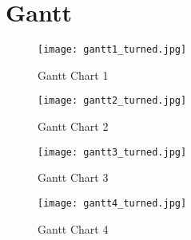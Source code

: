 \label{tab:PlanungMeilensteineTable}
\section{Gantt} 
\label{sec:PlanungGantt} 
\begin{landscape}
	\begin{figure}[htbp]
		\centering
		\texttt{[image: gantt1\_turned.jpg]}
		\caption{Gantt Chart 1}
		\label{fig:gantt1}
	\end{figure}

	\begin{figure}[htbp]
		\centering
		\texttt{[image: gantt2\_turned.jpg]}
		\caption{Gantt Chart 2}
		\label{fig:gantt2}
	\end{figure}

	\begin{figure}[htbp]
		\centering
		\texttt{[image: gantt3\_turned.jpg]}
		\caption{Gantt Chart 3}
		\label{fig:gantt3}
	\end{figure}

	\begin{figure}[htbp]
		\centering
		\texttt{[image: gantt4\_turned.jpg]}
		\caption{Gantt Chart 4}
		\label{fig:gantt4}
	\end{figure}
\end{landscape}



